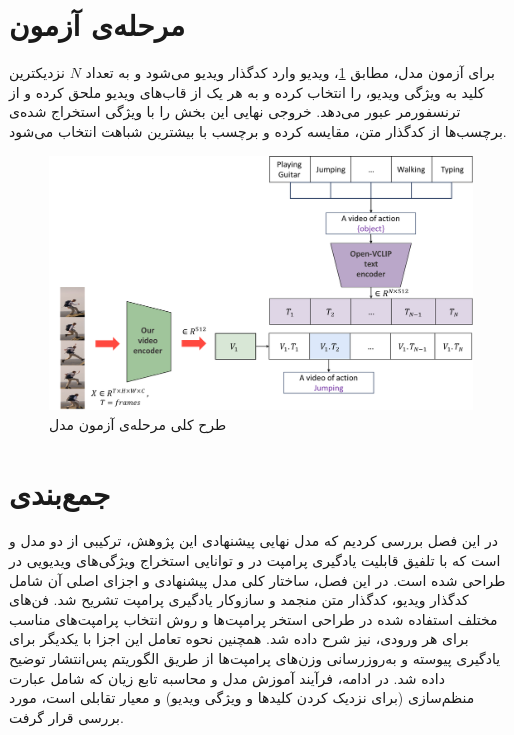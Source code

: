 \section{مرحله‌ی آزمون }
برای آزمون مدل، مطابق \cref{fig.35}، ویدیو وارد کدگذار ویدیو می‌شود و به تعداد $N$ نزدیکترین کلید به ویژگی ویدیو، را انتخاب کرده و به هر یک از قاب‌های ویدیو ملحق کرده و از ترنسفورمر عبور می‌دهد. خروجی نهایی این بخش را با ویژگی استخراج شده‌ی برچسب‌ها از کدگذار متن، مقایسه کرده و برچسب با بیشترین شباهت انتخاب می‌شود.
‌\begin{figure}
	\centering\includegraphics[scale=.48]{Images/Chapter3/test_phase.png}
	\caption[]{طرح کلی مرحله‌ی آزمون مدل }
	\label{fig.35}
\end{figure}
\section{جمع‌بندی}
در این فصل بررسی کردیم که مدل نهایی پیشنهادی این پژوهش، ترکیبی از دو مدل  و  است که با تلفیق قابلیت یادگیری پرامپت در  و توانایی استخراج ویژگی‌های ویدیویی در  طراحی شده است. در این فصل، ساختار کلی مدل پیشنهادی و اجزای اصلی آن شامل کدگذار ویدیو، کدگذار متن منجمد و سازوکار یادگیری پرامپت تشریح شد. فن‌های مختلف استفاده شده در طراحی استخر پرامپت‌ها و روش انتخاب پرامپت‌های مناسب برای هر ورودی، نیز شرح داده شد. همچنین نحوه تعامل این اجزا با یکدیگر برای یادگیری پیوسته و به‌روزرسانی وزن‌های پرامپت‌ها از طریق الگوریتم پس‌انتشار توضیح داده شد. در ادامه، فرآیند آموزش مدل و محاسبه تابع زیان که شامل عبارت منظم‌سازی (برای نزدیک کردن کلیدها و ویژگی ویدیو) و معیار تقابلی است، مورد بررسی قرار گرفت.


